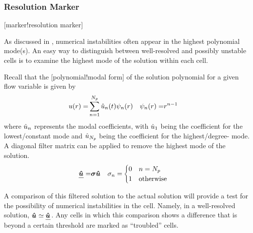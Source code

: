 \subsubsection{Resolution Marker}
\label{SEC:ResolutionMarker}
\key*{}[marker!resolution marker]



As discussed in , numerical instabilities often
appear in the highest polynomial mode(s).
%
An easy way to distinguish between well-resolved and possibly unstable
cells is to examine the highest mode of the solution within each cell.
 

Recall that the [polynomial!modal form] of the
solution polynomial for a given flow variable is given by 
\begin{align*}
       u (r) =& \sum_{n=1}^{N_p} \uModal[n] (t) \psi_n (r)
& \psi_n (r) =& r^{n-1}
\end{align*}
where $\uModal[n]$ represents the modal coefficients, with $\uModal[1]$ being
the coefficient for the lowest\slash constant mode and $\uModal[N_p]$ being
the coefficient for the highest\slash degree-\PO{} mode.
%
A diagonal filter matrix can be applied to remove the highest mode of the
solution.
\begin{align}
    \bm{\underline{\uModal[]}}
 =& \bm{\sigma} \bm{\uModal[]}
  &
    \sigma_n
 =& \begin{cases}
      0 & n = N_p \\
      1 & \text{otherwise}
    \end{cases}
\end{align}
 
A comparison of this filtered solution to the actual solution will
provide a test for the possibility of numerical instabilities in
the cell.
%
Namely, in a well-resolved solution,
$\bm{\uModal[]} \simeq \bm{\underline{\uModal[]}}$.
%
Any cells in which this comparison shows a difference that is beyond
a certain threshold are marked as ``troubled'' cells.


